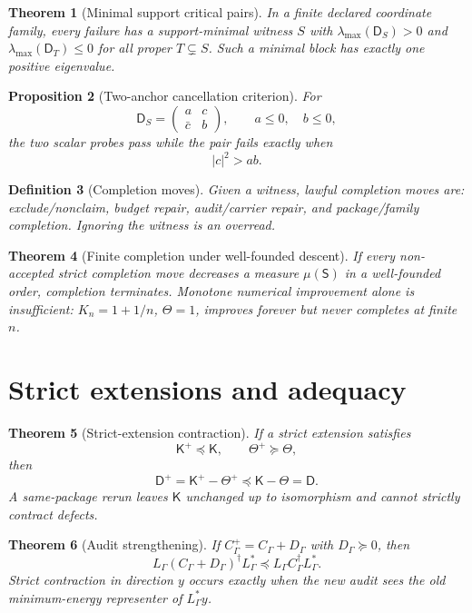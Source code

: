 \documentclass[11pt]{article}
\newtheorem{theorem}{Theorem}[section]
\newtheorem{proposition}[theorem]{Proposition}
\newtheorem{definition}[theorem]{Definition}
\newcommand{\K}{\mathsf K}
\newcommand{\Defect}{\mathsf D}
\begin{document}
\begin{theorem}[Minimal support critical pairs]
In a finite declared coordinate family, every failure has a support-minimal witness \(S\) with \(\lambda_{\max}(\Defect_S)>0\) and \(\lambda_{\max}(\Defect_T)\le0\) for all proper \(T\subsetneq S\).  Such a minimal block has exactly one positive eigenvalue.
\end{theorem}

\begin{proposition}[Two-anchor cancellation criterion]
For
\[
  \Defect_S=\begin{pmatrix}a&c\\\bar c&b\end{pmatrix},
  \qquad a\le0,
  \quad b\le0,
\]
the two scalar probes pass while the pair fails exactly when
\[
  |c|^2>ab.
\]
\end{proposition}

\begin{definition}[Completion moves]
Given a witness, lawful completion moves are: exclude/nonclaim, budget repair, audit/carrier repair, and package/family completion.  Ignoring the witness is an overread.
\end{definition}

\begin{theorem}[Finite completion under well-founded descent]
If every non-accepted strict completion move decreases a measure \(\mu(\mathsf S)\) in a well-founded order, completion terminates.  Monotone numerical improvement alone is insufficient: \(K_n=1+1/n\), \(\Theta=1\), improves forever but never completes at finite \(n\).
\end{theorem}

\section{Strict extensions and adequacy}

\begin{theorem}[Strict-extension contraction]
If a strict extension satisfies
\[
  \K^+\preceq\K,
  \qquad \Theta^+\succeq\Theta,
\]
then
\[
  \Defect^+=\K^+-\Theta^+\preceq \K-\Theta=\Defect.
\]
A same-package rerun leaves \(\K\) unchanged up to isomorphism and cannot strictly contract defects.
\end{theorem}

\begin{theorem}[Audit strengthening]
If \(C_\Gamma^+=C_\Gamma+D_\Gamma\) with \(D_\Gamma\succeq0\), then
\[
  L_\Gamma(C_\Gamma+D_\Gamma)^\dagger L_\Gamma^*
  \preceq
  L_\Gamma C_\Gamma^\dagger L_\Gamma^*.
\]
Strict contraction in direction \(y\) occurs exactly when the new audit sees the old minimum-energy representer of \(L_\Gamma^*y\).
\end{theorem}
\end{document}
